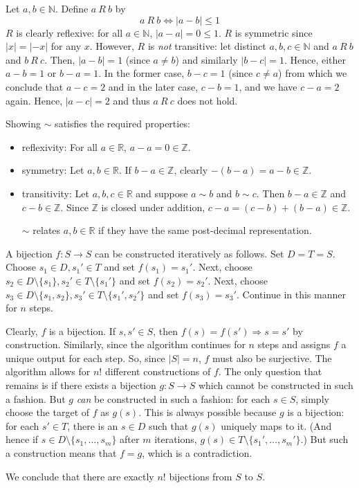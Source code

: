 \documentclass[a4paper]{report}
\newenvironment{ex}[1]
    {\noindent{\large \bf Exercise #1.}}{\vspace{0.5cm}}
\begin{document}
\begin{ex}{1.5}
 Let $a, b \in \mathbb{N}$. Define $a~R~b$ by
 \[
   a~R~b \Longleftrightarrow |a - b| \leq 1
  \]
  $R$ is clearly reflexive: for all $a \in \mathbb{N}$, $|a - a| = 0 \leq 1$. $R$ is symmetric since
  $|x| = |-x|$ for any $x$. However, $R$ is \emph{not} transitive: let distinct $a, b, c \in
  \mathbb{N}$ and $a~R~b$ and $b~R~c$. Then, $|a - b| = 1$ (since $a \neq b$) and similarly $|b - c| = 1$. Hence,
  either $a - b = 1$ or $b - a = 1$. In the former case, $b - c = 1$ (since $c \neq a$) from which we conclude
  that $a - c = 2$ and in the later case, $c - b = 1$, and we have $c - a = 2$ again. Hence, $|a - c| = 2$ and thus
  $a~R~c$ does not hold.
\end{ex}

\begin{ex}{1.6}
  Showing $\sim$ satisfies the required properties:
  \begin{itemize}
  \item reflexivity: For all $a \in \mathbb{R}$, $a -a = 0 \in \mathbb{Z}$.
  \item symmetry: Let $a, b \in \mathbb{R}$. If $b - a \in \mathbb{Z}$, clearly $-(b - a) = a - b \in \mathbb{Z}$.
  \item transitivity: Let $a, b, c \in \mathbb{R}$ and suppose $a \sim b$ and $b \sim c$. Then $b-a \in \mathbb{Z}$ and $c - b \in \mathbb{Z}$. Since 
    $\mathbb{Z}$ is closed under addition, $c - a = (c-b) + (b - a) \in \mathbb{Z}$.

    $\sim$ relates $a,b \in \mathbb{R}$ if they have the same post-decimal representation.
  \end{itemize}
\end{ex}
\begin{ex}{2.1}
  A bijection $f : S \rightarrow S$ can be constructed iteratively as
  follows. Set $D = T = S$.  Choose $s_1 \in D, s_1' \in T$ and set
  $f(s_1) = s_1'$. Next, choose $s_2 \in D \setminus \{s_1\}, s_2' \in
  T \setminus \{s_1'\}$ and set $f(s_2) = s_2'$.  Next, choose $s_3
  \in D \setminus \{s_1, s_2\}, s_3' \in T \setminus \{s_1',s_2'\}$
  and set $f(s_3) = s_3'$.  Continue in this manner for $n$ steps.

  Clearly, $f$ is a bijection. If $s, s' \in S$, then $f(s) = f(s')
  \Rightarrow s = s'$ by construction.  Similarly, since the algorithm
  continues for $n$ steps and assigns $f$ a unique output for each
  step. So, since $|S| = n$, $f$ must also be surjective.  The
  algorithm allows for $n!$ different constructions of $f$. The only
  question that remains is if there exists a bijection $g : S
  \rightarrow S$ which cannot be constructed in such a fashion.  But
  $g$ \emph{can} be constructed in such a fashion: for each $s \in S$,
  simply choose the target of $f$ as $g(s)$. This is always possible
  because $g$ is a bijection: for each $s' \in T$, there is an $s \in
  D$ such that $g(s)$ uniquely maps to it. (And hence if $s \in D
  \setminus \{s_1, \dots, s_m\}$ after $m$ iterations, $g(s) \in T
  \setminus \{s_1', \dots, s_m'\}$.) But such a construction means
  that $f = g$, which is a contradiction.

  We conclude that there are exactly $n!$ bijections from $S$ to $S$.
  
\end{ex}
\end{document}
